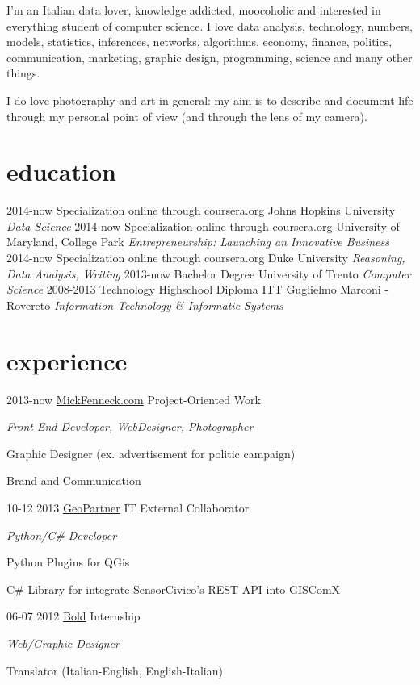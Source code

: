 \documentclass[]{friggeri-cv}
\begin{document}
I'm an Italian data lover, knowledge addicted, moocoholic and interested in everything student of computer science.
I love data analysis, technology, numbers, models, statistics, inferences, networks, algorithms, economy, finance, politics, communication, marketing, graphic design, programming, science and many other things.

I do love photography and art in general: my aim is to describe and document life through my personal point of view (and through the lens of my camera).

\section{education}

\begin{entrylist}
  \entry
    {2014-now}
    {Specialization {\normalfont online through coursera.org}}
    {Johns Hopkins University}
    {\emph{Data Science}}
\entry
    {2014-now}
    {Specialization {\normalfont online through coursera.org}}
    {University of Maryland, College Park}
    {\emph{Entrepreneurship: Launching an Innovative Business}}
\entry
    {2014-now}
    {Specialization {\normalfont online through coursera.org}}
    {Duke University}
    {\emph{Reasoning, Data Analysis, Writing}}
\entry
    {2013-now}
    {Bachelor Degree}
    {University of Trento}
    {\emph{Computer Science}}
\entry
    {2008-2013}
    {Technology Highschool Diploma}
    {ITT Guglielmo Marconi - Rovereto}
    {\emph{Information Technology \& Informatic Systems}}

\end{entrylist}

\section{experience}

\begin{entrylist}
  \entry
    {2013-now}
    {\href{http://www.mickfenneck.com}{MickFenneck.com}}
    {Project-Oriented Work}
    {\emph{Front-End Developer, WebDesigner, Photographer}

	{Graphic Designer (ex. advertisement for politic campaign)}

	{Brand and Communication}
    }
\entry
    {10-12 2013}
    {\href{http://www.geopartner.it}{GeoPartner}}
    {IT External Collaborator}
    {\emph{Python/C\# Developer}

	{Python Plugins for QGis}
	
	{C\# Library for integrate SensorCivico's REST API into GISComX}
    }
\entry
    {06-07 2012}
    {\href{http://www.studiobold.it}{Bold}}
    {Internship}
    {\emph{Web/Graphic Designer}

	{Translator (Italian-English, English-Italian)}
    }
\end{entrylist}
\end{document}
